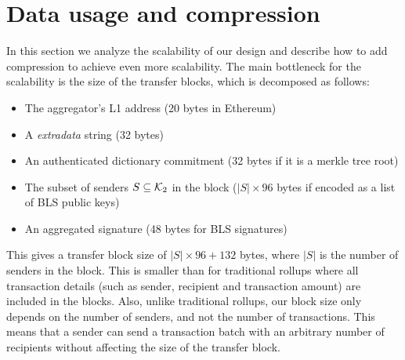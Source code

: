 \section{Data usage and compression}

In this section we analyze the scalability of our design and describe
how to add compression to achieve even more scalability. The main
bottleneck for the scalability is the size of the transfer blocks,
which is decomposed as follows:

\begin{itemize}
\item The aggregator's L1 address (20 bytes in Ethereum)
\item A \emph{extradata} string (32 bytes)
\item An authenticated dictionary commitment (32 bytes if it is a
merkle tree root)
\item The subset of senders \(S \subseteq \mathcal{K}_2\) in the block (\(|S|
\times 96\) bytes if encoded as a list of BLS public keys)
\item An aggregated signature (48 bytes for BLS signatures)
\end{itemize}

This gives a transfer block size of \(|S| \times 96 + 132\) bytes,
where \(|S|\) is the number of senders in the block. This is smaller
than for traditional rollups where all transaction details (such as
sender, recipient and transaction amount) are included in the blocks.
Also, unlike traditional rollups, our block size only depends on the
number of senders, and not the number of transactions. This means
that a sender can send a transaction batch with an arbitrary number
of recipients without affecting the size of the transfer block.

